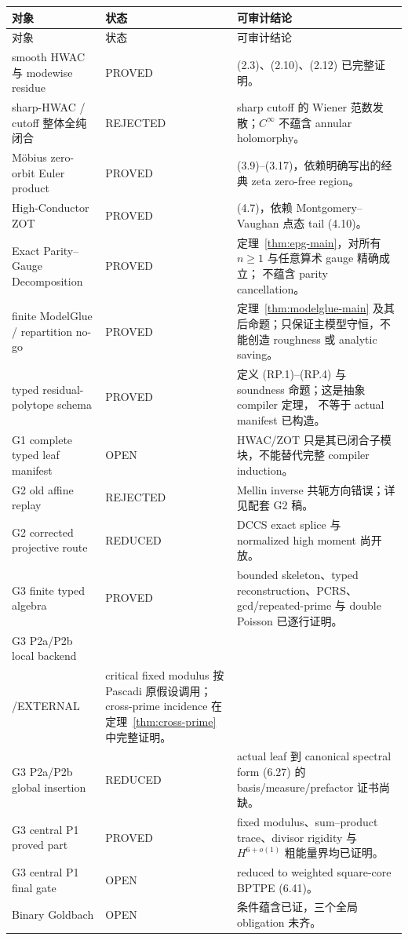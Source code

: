 \documentclass[11pt,a4paper]{ctexart}
\theoremstyle{definition}
\newcommand{\1}{\mathbf 1}
\newcommand{\OPEN}{\textcolor{red!70!black}{\textsf{OPEN}}}
\newcommand{\REDUCED}{\textcolor{orange!80!black}{\textsf{REDUCED}}}
\newcommand{\PROVED}{\textcolor{green!45!black}{\textsf{PROVED}}}
\newcommand{\EXTERNAL}{\textcolor{blue!70!black}{\textsf{EXTERNAL}}}
\newcommand{\REJECTED}{\textcolor{purple!75!black}{\textsf{REJECTED}}}
\begin{document}
\begin{longtable}{p{}p{}p{}}
\toprule
对象 & 状态 & 可审计结论\\ \midrule
\endfirsthead
\toprule 对象 & 状态 & 可审计结论\\ \midrule\endhead
smooth HWAC 与 modewise residue & \PROVED
& (2.3)、(2.10)、(2.12) 已完整证明。\\
sharp-HWAC / cutoff 整体全纯闭合 & \REJECTED
& sharp cutoff 的 Wiener 范数发散；$C^\infty$ 不蕴含 annular holomorphy。\\
Möbius zero-orbit Euler product & \PROVED
& (3.9)--(3.17)，依赖明确写出的经典 zeta zero-free region。\\
High-Conductor ZOT & \PROVED
& (4.7)，依赖 Montgomery--Vaughan 点态 tail (4.10)。\\
Exact Parity--Gauge Decomposition & \PROVED
& 定理~\ref{thm:epg-main}，对所有 $n\ge1$ 与任意算术 gauge 精确成立；
不蕴含 parity cancellation。\\
finite ModelGlue / repartition no-go & \PROVED
& 定理~\ref{thm:modelglue-main} 及其后命题；只保证主模型守恒，不能创造
roughness 或 analytic saving。\\
typed residual-polytope schema & \PROVED
& 定义 (RP.1)--(RP.4) 与 soundness 命题；这是抽象 compiler 定理，
不等于 actual manifest 已构造。\\
G1 complete typed leaf manifest & \OPEN
& HWAC/ZOT 只是其已闭合子模块，不能替代完整 compiler induction。\\
G2 old affine replay & \REJECTED
& Mellin inverse 共轭方向错误；详见配套 G2 稿。\\
G2 corrected projective route & \REDUCED
& DCCS exact splice 与 normalized high moment 尚开放。\\
G3 finite typed algebra & \PROVED
& bounded skeleton、typed reconstruction、PCRS、gcd/repeated-prime 与
double Poisson 已逐行证明。\\
G3 P2a/P2b local backend &
\begin{tabular}{@{}c@{}}\PROVED\\[-1mm]/\EXTERNAL\end{tabular}
& critical fixed modulus 按 Pascadi 原假设调用；cross-prime incidence 在
定理~\ref{thm:cross-prime} 中完整证明。\\
G3 P2a/P2b global insertion & \REDUCED
& actual leaf 到 canonical spectral form (6.27) 的 basis/measure/prefactor
证书尚缺。\\
G3 central P1 proved part & \PROVED
& fixed modulus、sum--product trace、divisor rigidity 与 $H^{6+o(1)}$
粗能量界均已证明。\\
G3 central P1 final gate & \OPEN
& reduced to weighted square-core BPTPE (6.41)。\\
Binary Goldbach & \OPEN
& 条件蕴含已证，三个全局 obligation 未齐。\\
\bottomrule
\end{longtable}
\end{document}

